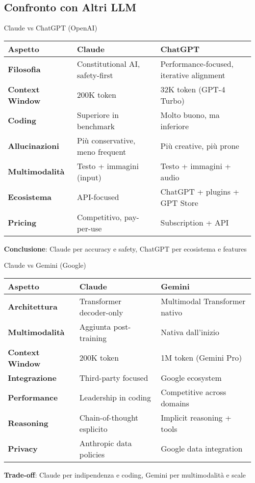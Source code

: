 \documentclass[aspectratio=169]{beamer}
\begin{document}
\subsection{Confronto con Altri LLM}
%
%
\begin{frame}{Claude vs ChatGPT (OpenAI)}
\begin{table}[h]
\centering
\footnotesize
\begin{tabular}{|p{3cm}|p{4cm}|p{4cm}|}
\hline
\textbf{Aspetto} & \textbf{Claude} & \textbf{ChatGPT} \\
\hline
\textbf{Filosofia} & Constitutional AI, safety-first & Performance-focused, iterative alignment \\
\hline
\textbf{Context Window} & 200K token & 32K token (GPT-4 Turbo) \\
\hline
\textbf{Coding} & Superiore in benchmark & Molto buono, ma inferiore \\
\hline
\textbf{Allucinazioni} & Più conservative, meno frequent & Più creative, più prone \\
\hline
\textbf{Multimodalità} & Testo + immagini (input) & Testo + immagini + audio \\
\hline
\textbf{Ecosistema} & API-focused & ChatGPT + plugins + GPT Store \\
\hline
\textbf{Pricing} & Competitivo, pay-per-use & Subscription + API \\
\hline
\end{tabular}
\end{table}

\textbf{Conclusione}: Claude per accuracy e safety, ChatGPT per ecosistema e features
\end{frame}
%
%
\begin{frame}{Claude vs Gemini (Google)}
\begin{table}[h]
\centering
\footnotesize
\begin{tabular}{|p{3cm}|p{4cm}|p{4cm}|}
\hline
\textbf{Aspetto} & \textbf{Claude} & \textbf{Gemini} \\
\hline
\textbf{Architettura} & Transformer decoder-only & Multimodal Transformer nativo \\
\hline
\textbf{Multimodalità} & Aggiunta post-training & Nativa dall'inizio \\
\hline
\textbf{Context Window} & 200K token & 1M token (Gemini Pro) \\
\hline
\textbf{Integrazione} & Third-party focused & Google ecosystem \\
\hline
\textbf{Performance} & Leadership in coding & Competitive across domains \\
\hline
\textbf{Reasoning} & Chain-of-thought esplicito & Implicit reasoning + tools \\
\hline
\textbf{Privacy} & Anthropic data policies & Google data integration \\
\hline
\end{tabular}
\end{table}

\textbf{Trade-off}: Claude per indipendenza e coding, Gemini per multimodalità e scale
\end{frame}
\end{document}
